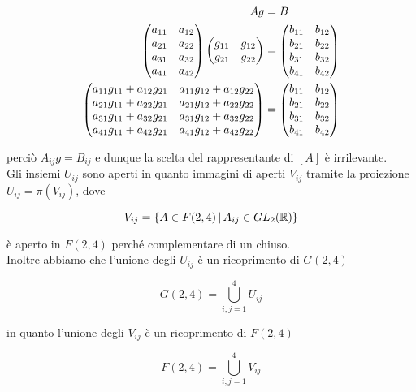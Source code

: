 \begin{align}
	\begin{split}
		A g &= B\\
		\pmqty{ a_{11} & a_{12} \\ a_{21} & a_{22} \\ a_{31} & a_{32} \\ a_{41} & a_{42} } \pmqty{ g_{11} & g_{12} \\ g_{21} & g_{22} } &= \pmqty{ b_{11} & b_{12} \\ b_{21} & b_{22} \\ b_{31} & b_{32} \\ b_{41} & b_{42} }\\
		\pmqty{ a_{11} g_{11} + a_{12} g_{21} & a_{11} g_{12} + a_{12} g_{22} \\ a_{21} g_{11} + a_{22} g_{21} & a_{21} g_{12} + a_{22} g_{22} \\ a_{31} g_{11} + a_{32} g_{21} & a_{31} g_{12} + a_{32} g_{22} \\ a_{41} g_{11} + a_{42} g_{21} & a_{41} g_{12} + a_{42} g_{22} } &= \pmqty{ b_{11} & b_{12} \\ b_{21} & b_{22} \\ b_{31} & b_{32} \\ b_{41} & b_{42} }
	\end{split}
\end{align}

perciò $ A_{ij} g = B_{ij} $ e dunque la scelta del rappresentante di $ [A] $ è irrilevante.\\
Gli insiemi $ U_{ij} $ sono aperti in quanto immagini di aperti $ V_{ij} $ tramite la proiezione $ U_{ij} = \pi(V_{ij}) $, dove 

\begin{equation}
	V_{ij} = \left\{ A \in F(2,4) \, \middle| \, A_{ij} \in GL_{2}(\mathbb{R}) \right\}
\end{equation}

è aperto in $ F(2,4) $ perché complementare di un chiuso.\\
Inoltre abbiamo che l'unione degli $ U_{ij} $ è un ricoprimento di $ G(2,4) $

\begin{equation}
	G(2,4) = \bigcup_{i,j=1}^{4} U_{ij}
\end{equation}

in quanto l'unione degli $ V_{ij} $ è un ricoprimento di $ F(2,4) $

\begin{equation}
	F(2,4) = \bigcup_{i,j=1}^{4} V_{ij}
\end{equation}

